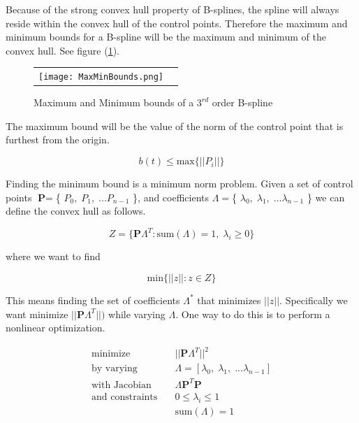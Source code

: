 \documentclass{article}
\begin{document}
Because of the strong convex hull property of B-splines, the spline will always reside within the convex hull of the control points. Therefore the maximum and minimum bounds for a B-spline will be the maximum and minimum of the convex hull. See figure (\ref{Fig:MaxMinBounds}).

\begin{figure}[H]
\begin{tabular}{ll}
\texttt{[image: MaxMinBounds.png]}
\end{tabular}
\caption{Maximum and Minimum bounds of a \(3^{rd}\) order B-spline}
\label{Fig:MaxMinBounds}
\end{figure}

 The maximum bound will be the value of the norm of the control point that is furthest from the origin.

    \begin{equation}
        b(t) \leq \text{max} \{||P_i||\}
    \end{equation}
    
Finding the minimum bound is a minimum norm problem. Given a set of control points \(\textbf{P} = \)\{ \(P_0, \; P_1, \; ... P_{n-1}\) \}, and coefficients \(\Lambda = \)\{ \(\lambda_0, \; \lambda_1, \; ... \lambda_{n-1}\) \} we can define the convex hull as follows.

\begin{equation}
    Z = \{ \textbf{P} \Lambda^{T} : \text{sum}(\Lambda) = 1,\; \lambda_{i} \geq 0\}
\end{equation}

where we want to find

\begin{equation}
    \text{min}\{||z|| : z \in Z\}
\end{equation}

This means finding the set of coefficients \(\Lambda^*\) that minimizes \(||z||\). Specifically we want minimize \(||\textbf{P} \Lambda^{T}||)\) while varying \(\Lambda\). One way to do this is to perform a nonlinear optimization.

\begin{equation}
\begin{aligned}
    \text{minimize} & \quad ||\textbf{P} \Lambda^{T}||^2 \\
    \text{by varying} &  \quad  \Lambda = [\lambda_0, \; \lambda_1, \; ... \lambda_{n-1}] \\
    \text{with Jacobian} & \quad \Lambda\textbf{P}^{T}\textbf{P} \\
    \text{and constraints} & \quad 0 \leq \lambda_i \leq 1 \\
     & \quad \text{sum}(\Lambda) = 1
\end{aligned}
\end{equation}
\end{document}
